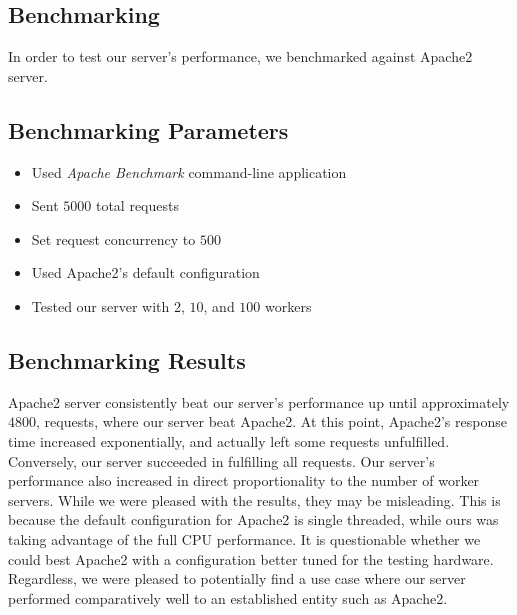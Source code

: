 \documentclass[10pt]{article}
\begin{document}
\pagebreak
\begin{multicols}{2}
\section*{Benchmarking}
\par
In order to test our server's performance, we benchmarked against Apache2 server.
\subsection*{Benchmarking Parameters}
\begin{itemize}
\item
Used \textit{Apache Benchmark} command-line application
\item
Sent $5000$ total requests
\item
Set request concurrency to $500$
\item
Used Apache2's default configuration
\item
Tested our server with $2$, $10$, and $100$ workers
\end{itemize}
\subsection*{Benchmarking Results}
\par
Apache2 server consistently beat our server's performance up until approximately $4800$, requests, where our server beat Apache2.  At this point, Apache2's response time increased exponentially, and actually left some requests unfulfilled.  Conversely, our server succeeded in fulfilling all requests. Our server's performance also increased in direct proportionality to the number of worker servers. While we were pleased with the results, they may be misleading. This is because the default configuration for Apache2 is single threaded, while ours was taking advantage of the full CPU performance.  It is questionable whether we could best Apache2 with a configuration better tuned for the testing hardware. Regardless, we were pleased to potentially find a use case where our server performed comparatively well to an established entity such as Apache2.
\end{multicols}
\end{document}
